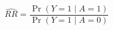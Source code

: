 \documentclass[border=8pt]{standalone}
\begin{document}
\begin{minipage}{7cm}\centering\Large
\[\widehat{RR}=\frac{\Pr(Y=1\mid A=1)}{\Pr(Y=1\mid A=0)}\]
\end{minipage}
\end{document}
